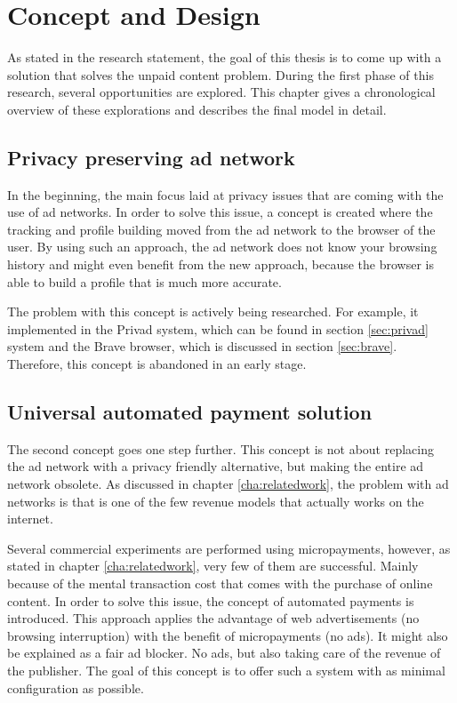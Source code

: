 \chapter{Concept and Design}
\label{cha:conceptanddesign}

As stated in the research statement, the goal of this thesis is to come up with a solution that solves the unpaid content problem. During the first phase of this research, several opportunities are explored. This chapter gives a chronological overview of these explorations and describes the final model in detail.

\section{Privacy preserving ad network}
In the beginning, the main focus laid at privacy issues that are coming with the use of ad networks. In order to solve this issue, a concept is created where the tracking and profile building moved from the ad network to the browser of the user. By using such an approach, the ad network does not know your browsing history and might even benefit from the new approach, because the browser is able to build a profile that is much more accurate. 

The problem with this concept is actively being researched. For example, it implemented in the Privad system, which can be found in section \ref{sec:privad} system and the Brave browser, which is discussed in section \ref{sec:brave}. Therefore, this concept is abandoned in an early stage.

\section{Universal automated payment solution}
The second concept goes one step further. This concept is not about replacing the ad network with a privacy friendly alternative, but making the entire ad network obsolete. As discussed in chapter \ref{cha:relatedwork}, the problem with ad networks is that is one of the few revenue models that actually works on the internet.

Several commercial experiments are performed using micropayments, however, as stated in chapter \ref{cha:relatedwork}, very few of them are successful. Mainly because of the mental transaction cost that comes with the purchase of online content. In order to solve this issue, the concept of automated payments is introduced. This approach applies the advantage of web advertisements (no browsing interruption) with the benefit of micropayments (no ads). It might also be explained as a fair ad blocker. No ads, but also taking care of the revenue of the publisher. The goal of this concept is to offer such a system with as minimal configuration as possible.
\vspace{2em}

